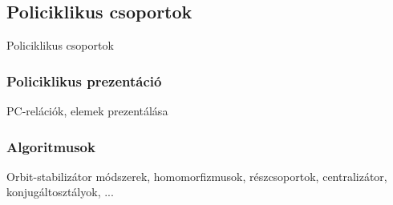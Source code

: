 \subsection{Policiklikus csoportok}
\label{subsec:policiklikus}
Policiklikus csoportok

\subsubsection{Policiklikus prezentáció}
PC-relációk, elemek prezentálása

\subsubsection{Algoritmusok}
Orbit-stabilizátor módszerek, homomorfizmusok, részcsoportok, centralizátor, konjugáltosztályok, ...
